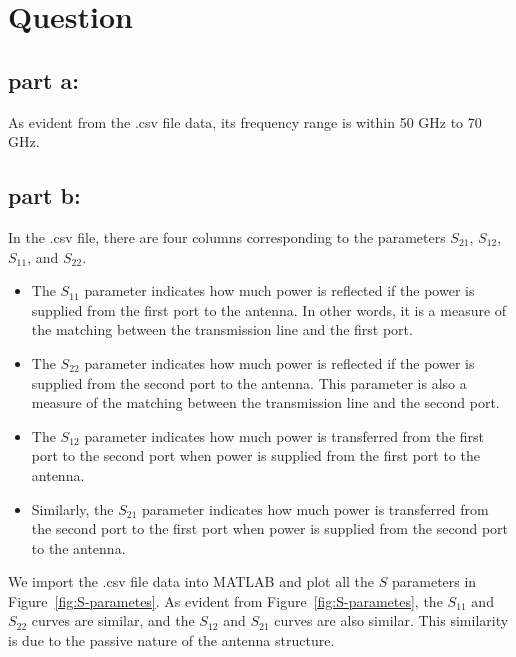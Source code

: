 \documentclass[12pt,onecolumn,a4paper]{article}
\newcommand\question{
	\section{Question \numberstringnum{\thesection}}
}
\begin{document}
	\FloatBarrier
	\question%

	
	\FloatBarrier
	\subsection{part a:}
	As evident from the .csv file data, its frequency range is within 50 GHz to 70 GHz.
	
	
	
	\FloatBarrier
	\subsection{part b:}
	
	In the .csv file, there are four columns corresponding to the parameters $S_{21}$, $S_{12}$, $S_{11}$, and $S_{22}$. 

	\begin{itemize}
		\item The $S_{11}$ parameter indicates how much power is reflected if the power is supplied from the first port to the antenna. 
		In other words, it is a measure of the matching between the transmission line and the first port. 
		\item The $S_{22}$ parameter indicates how much power is reflected if the power is supplied from the second port to the antenna. 
		This parameter is also a measure of the matching between the transmission line and the second port. 
		\item The $S_{12}$ parameter indicates how much power is transferred from the first port to the second port when power is supplied from the first port to the antenna. 
		\item Similarly, the $S_{21}$ parameter indicates how much power is transferred from the second port to the first port when power is supplied from the second port to the antenna. 
	\end{itemize}

	We import the .csv file data into MATLAB and plot all the $S$ parameters in Figure~\ref{fig:S-parametes}. 
	As evident from Figure~\ref{fig:S-parametes}, the $S_{11}$ and $S_{22}$ curves are similar, and the $S_{12}$ and $S_{21}$ curves are also similar. 
	This similarity is due to the passive nature of the antenna structure.
	
\end{document}
